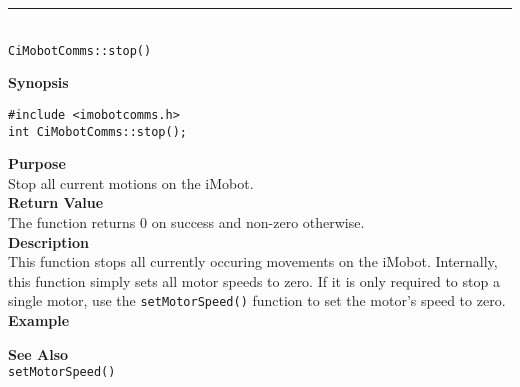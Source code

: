 \noindent
\vspace{5pt}
\rule{4.5in}{0.015in}\\
\noindent
{\LARGE \texttt{CiMobotComms::stop()}}\\
{}

\noindent
{\bf Synopsis}\\
\begin{verbatim}
#include <imobotcomms.h>
int CiMobotComms::stop();
\end{verbatim}

\noindent
{\bf Purpose}\\
Stop all current motions on the iMobot.\\

\noindent
{\bf Return Value}\\
The function returns 0 on success and non-zero otherwise.\\

\noindent
{\bf Description}\\
This function stops all currently occuring movements on the iMobot. Internally, this function simply sets all motor speeds to zero. If it is only required to stop a single motor, use the 
\texttt{setMotorSpeed()} function to set the motor's speed to zero. \\

\noindent
{\bf Example}\\
\noindent

\noindent
{\bf See Also}\\
\texttt{setMotorSpeed()}

